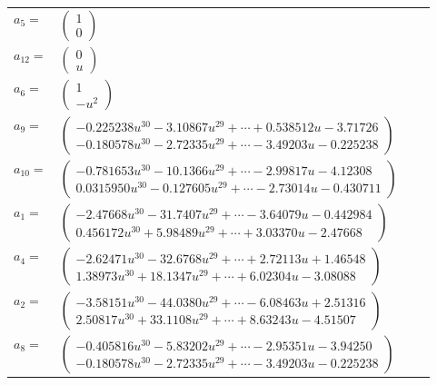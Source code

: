 \documentclass[1p]{elsarticle_modified}
\theoremstyle{definition}
\begin{document}
\begin{tabular}{m{7pt} m{180pt} m{7pt} m{180pt} }
\flushright $a_{5}=$&$\begin{pmatrix}1\\0\end{pmatrix}$ \\
\flushright $a_{12}=$&$\begin{pmatrix}0\\u\end{pmatrix}$ \\
\flushright $a_{6}=$&$\begin{pmatrix}1\\- u^2\end{pmatrix}$ \\
\flushright $a_{9}=$&$\begin{pmatrix}-0.225238 u^{30}-3.10867 u^{29}+\cdots+0.538512 u-3.71726\\-0.180578 u^{30}-2.72335 u^{29}+\cdots-3.49203 u-0.225238\end{pmatrix}$ \\
\flushright $a_{10}=$&$\begin{pmatrix}-0.781653 u^{30}-10.1366 u^{29}+\cdots-2.99817 u-4.12308\\0.0315950 u^{30}-0.127605 u^{29}+\cdots-2.73014 u-0.430711\end{pmatrix}$ \\
\flushright $a_{1}=$&$\begin{pmatrix}-2.47668 u^{30}-31.7407 u^{29}+\cdots-3.64079 u-0.442984\\0.456172 u^{30}+5.98489 u^{29}+\cdots+3.03370 u-2.47668\end{pmatrix}$ \\
\flushright $a_{4}=$&$\begin{pmatrix}-2.62471 u^{30}-32.6768 u^{29}+\cdots+2.72113 u+1.46548\\1.38973 u^{30}+18.1347 u^{29}+\cdots+6.02304 u-3.08088\end{pmatrix}$ \\
\flushright $a_{2}=$&$\begin{pmatrix}-3.58151 u^{30}-44.0380 u^{29}+\cdots-6.08463 u+2.51316\\2.50817 u^{30}+33.1108 u^{29}+\cdots+8.63243 u-4.51507\end{pmatrix}$ \\
\flushright $a_{8}=$&$\begin{pmatrix}-0.405816 u^{30}-5.83202 u^{29}+\cdots-2.95351 u-3.94250\\-0.180578 u^{30}-2.72335 u^{29}+\cdots-3.49203 u-0.225238\end{pmatrix}$ \\

\end{tabular}
\end{document}

